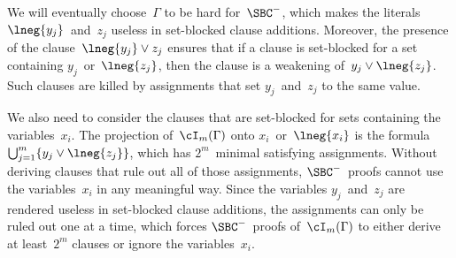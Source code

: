 \documentclass[12pt]{article}
\begin{document}
We will eventually choose~$\Gamma$ to be hard for~$\SBC^-$,
which makes the literals $\lneg{y_j}$~and~$z_j$
useless in set-blocked clause additions.
Moreover, the presence of the clause~$\lneg{y_j} \lor z_j$ ensures that
if a clause is set-blocked for a set containing $y_j$~or~$\lneg{z_j}$,
then the clause is a weakening of~$y_j \lor \lneg{z_j}$.
Such clauses are killed by assignments
that set $y_j$~and~$z_j$ to the same value.

We also need to consider the clauses that are set-blocked
for sets containing the variables~$x_i$.
The projection of~$\cI_m(\Gamma)$ onto $x_i$~or~$\lneg{x_i}$
is the formula~$\bigcup_{j = 1}^m \{y_j \lor \lneg{z_j}\}$,
which has $2^m$~minimal satisfying assignments.
Without deriving clauses that rule out all of those assignments,
$\SBC^-$~proofs cannot use the variables~$x_i$ in any meaningful way.
Since the variables $y_j$~and~$z_j$
are rendered useless in set-blocked clause additions,
the assignments can only be ruled out one at a time,
which forces $\SBC^-$~proofs of~$\cI_m(\Gamma)$
to either derive at least~$2^m$ clauses or ignore the variables~$x_i$.
\end{document}
